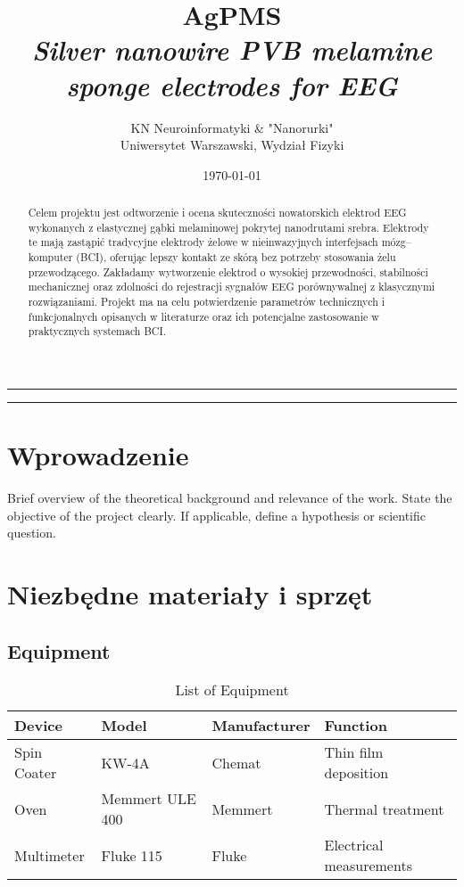 \documentclass[12pt,a4paper]{article}
\title{\textbf{AgPMS}\\ \large \emph{Silver nanowire PVB melamine sponge electrodes for EEG}}
\author{KN Neuroinformatyki \& "Nanorurki" \\
\small Uniwersytet Warszawski, Wydział Fizyki}
\date{\today}
\begin{document}
\maketitle
\hrule
\vspace{1em}

\begin{abstract}
    \noindent
    Celem projektu jest odtworzenie i ocena skuteczności nowatorskich elektrod EEG wykonanych z elastycznej gąbki melaminowej pokrytej nanodrutami srebra. Elektrody te mają zastąpić tradycyjne elektrody żelowe w nieinwazyjnych interfejsach mózg–komputer (BCI), oferując lepszy kontakt ze skórą bez potrzeby stosowania żelu przewodzącego. Zakładamy wytworzenie elektrod o wysokiej przewodności, stabilności mechanicznej oraz zdolności do rejestracji sygnałów EEG porównywalnej z klasycznymi rozwiązaniami. Projekt ma na celu potwierdzenie parametrów technicznych i funkcjonalnych opisanych w literaturze oraz ich potencjalne zastosowanie w praktycznych systemach BCI.

\end{abstract}

\vspace{1em}
\hrule
\vspace{1.5em}


\section{Wprowadzenie}
Brief overview of the theoretical background and relevance of the work. State the objective of the project clearly. If applicable, define a hypothesis or scientific question.

\section{Niezbędne materiały i sprzęt}

\subsection{Equipment}
\begin{table}[H]
    \centering
    \caption{List of Equipment}
    \begin{tabular}{@{}llll@{}}
        \toprule
        \textbf{Device} & \textbf{Model}  & \textbf{Manufacturer} & \textbf{Function}       \\
        \midrule
        Spin Coater     & KW-4A           & Chemat                & Thin film deposition    \\
        Oven            & Memmert ULE 400 & Memmert               & Thermal treatment       \\
        Multimeter      & Fluke 115       & Fluke                 & Electrical measurements \\
        \bottomrule
    \end{tabular}
\end{table}
\end{document}
